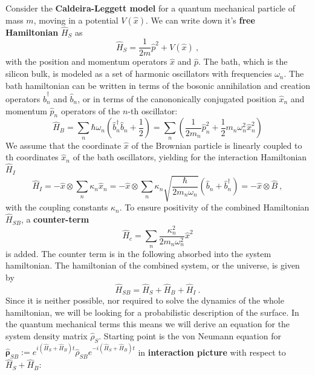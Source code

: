 		Consider the \textbf{Caldeira-Leggett model} \cite{caldeira1981influence} for a quantum mechanical particle of mass $m$, moving in a potential $V(\hat{x})$. We can write down it's \textbf{free Hamiltonian} $\hat{H}_S$ as 
		\begin{equation}
			\hat{H}_S =	\frac{1}{2m} \hat{p}^2 + V(\hat{x})~,
		\end{equation}   
		with the position and momentum operators $\hat{x}$ and $\hat{p}$. The bath, which is the silicon bulk, is modeled as a set of harmonic oscillators with frequencies $\omega_n$. The bath hamiltonian can be written in terms of the bosonic annihilation and creation operators $\hat{b}_n^\dagger$ and $\hat{b}_n$, or in terms of the canononically conjugated position $\hat{x}_n$ and momentum $\hat{p}_n$ operators of the $n$-th oscillator:
		\begin{equation}
			\hat{H}_B =	\sum_n \hbar \omega_n \left(\hat{b}_n^\dagger \hat{b}_n + \frac{1}{2} \right) =	\sum_n \left(\frac{1}{2 m_n} \hat{p}_n^2 + \frac{1}{2} m_n \omega_n^2 \hat{x}_n^2 \right)
		\end{equation}
		We assume that the coordinate $\hat{x}$ of the Brownian particle is linearly coupled to th coordinates $\hat{x}_n$ of the bath oscillators, yielding for the interaction Hamiltonian $\hat{H}_I$
		\begin{equation}
			\hat{H}_I =	- \hat{x} \otimes \sum_n \kappa_n \hat{x}_n =	-\hat{x} \otimes \sum_n \kappa_n \sqrt{\frac{\hbar}{2 m_n \omega_n}} \left(\hat{b}_n + \hat{b}_n^\dagger\right) =	- \hat{x} \otimes \hat{B} ~,
		\end{equation}
		with the coupling constants $\kappa_n$. To ensure positivity of the combined Hamiltonian $\hat{H}_{SB}$, a \textbf{counter-term}
		\begin{equation}
			\hat{H}_c =	\sum_n \frac{\kappa_n^2}{2 m_n \omega_n^2} \hat{x}^2 
		\end{equation}
		is added. The counter term is in the following absorbed into the system hamiltonian. The hamiltonian of the combined system, or the universe, is given by
		\begin{equation}
			\hat{H}_{SB} = \hat{H}_S + \hat{H}_B + \hat{H}_I~.
		\end{equation}
		Since it is neither possible, nor required to solve the dynamics of the whole hamiltonian, we will be looking for a probabilistic description of the surface. In the quantum mechanical terms this means we will derive an equation for the system  density matrix $\hat{\rho}_{S}$. Starting point is the von Neumann equation for $\boldsymbol{\hat{\rho}}_{SB} :=	e^{i \left(\hat{H}_S + \hat{H}_B\right)t} \hat{\rho}_{SB} e^{-i \left(\hat{H}_S + \hat{H}_B\right)t}$ in \textbf{interaction picture} with respect to $\hat{H}_S + \hat{H}_B$:
